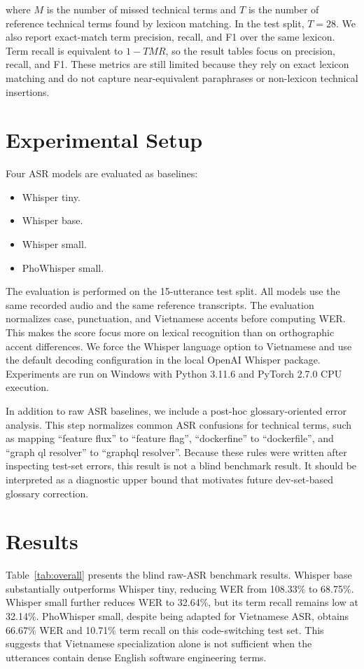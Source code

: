 \documentclass[conference]{IEEEtran}
\begin{document}
where $M$ is the number of missed technical terms and $T$ is the number of reference technical terms found by lexicon matching. In the test split, $T=28$. We also report exact-match term precision, recall, and F1 over the same lexicon. Term recall is equivalent to $1 - TMR$, so the result tables focus on precision, recall, and F1. These metrics are still limited because they rely on exact lexicon matching and do not capture near-equivalent paraphrases or non-lexicon technical insertions.

\section{Experimental Setup}
Four ASR models are evaluated as baselines:
\begin{itemize}
\item Whisper tiny.
\item Whisper base.
\item Whisper small.
\item PhoWhisper small.
\end{itemize}

The evaluation is performed on the 15-utterance test split. All models use the same recorded audio and the same reference transcripts. The evaluation normalizes case, punctuation, and Vietnamese accents before computing WER. This makes the score focus more on lexical recognition than on orthographic accent differences. We force the Whisper language option to Vietnamese and use the default decoding configuration in the local OpenAI Whisper package. Experiments are run on Windows with Python 3.11.6 and PyTorch 2.7.0 CPU execution.

In addition to raw ASR baselines, we include a post-hoc glossary-oriented error analysis. This step normalizes common ASR confusions for technical terms, such as mapping ``feature flux'' to ``feature flag'', ``dockerfine'' to ``dockerfile'', and ``graph ql resolver'' to ``graphql resolver''. Because these rules were written after inspecting test-set errors, this result is not a blind benchmark result. It should be interpreted as a diagnostic upper bound that motivates future dev-set-based glossary correction.

\section{Results}
Table~\ref{tab:overall} presents the blind raw-ASR benchmark results. Whisper base substantially outperforms Whisper tiny, reducing WER from 108.33\% to 68.75\%. Whisper small further reduces WER to 32.64\%, but its term recall remains low at 32.14\%. PhoWhisper small, despite being adapted for Vietnamese ASR, obtains 66.67\% WER and 10.71\% term recall on this code-switching test set. This suggests that Vietnamese specialization alone is not sufficient when the utterances contain dense English software engineering terms.
\end{document}
